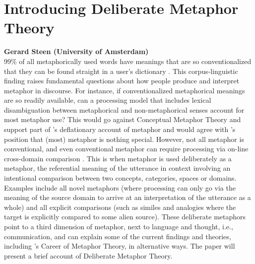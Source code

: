 \documentclass[10pt,letterpaper]{article}
\begin{document}
\section{Introducing Deliberate Metaphor Theory}
\large \textbf{Gerard Steen (University of Amsterdam)}\\
99\% of all metaphorically used words have meanings that are so conventionalized that they can be found straight in a user's dictionary \cite{steen2010method}. This corpus-linguistic finding raises fundamental questions about how people produce and interpret metaphor in discourse. For instance, if conventionalized metaphorical meanings are so readily available, can a processing model that includes lexical disambiguation between metaphorical and non-metaphorical senses account for most metaphor use? This would go against Conceptual Metaphor Theory \cite{lakoff2008metaphors} and support part of 's deflationary account of metaphor and would agree with 's position that (most) metaphor is nothing special. However, not all metaphor is conventional, and even conventional metaphor can require processing via on-line cross-domain comparison \cite{steen2008paradox, steen2015developing}. This is when metaphor is used deliberately as a metaphor, the referential meaning of the utterance in context involving an intentional comparison between two concepts, categories, spaces or domains. Examples include all novel metaphors (where processing can only go via the meaning of the source domain to arrive at an interpretation of the utterance as a whole) and all explicit comparisons (such as similes and analogies where the target is explicitly compared to some alien source). These deliberate metaphors point to a third dimension of metaphor, next to language and thought, i.e., communication, and can explain some of the current findings and theories, including 's  Career of Metaphor Theory, in alternative ways. The paper will present a brief account of Deliberate Metaphor Theory.
\end{document}
